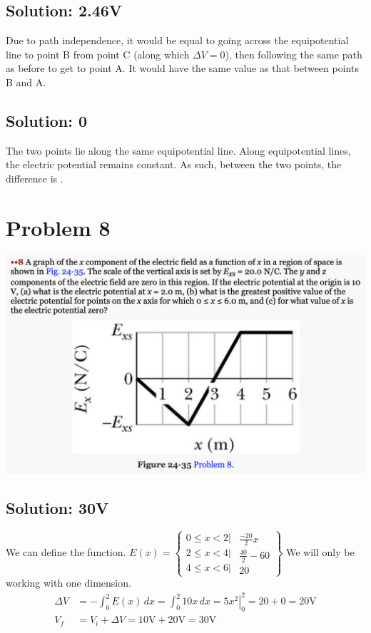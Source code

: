 \documentclass[12pt]{article}
\begin{document}
\subsection{Solution: 2.46V}
Due to path independence, it would be equal to going across the equipotential line to point B from point C (along which $\Delta V = 0$), then following the same path as before to get to point A.
It would have the same value as that between points B and A.

\subsection{Solution: 0}
The two points lie along the same equipotential line. 
Along equipotential lines, the electric potential remains constant.
As such, between the two points, the difference is .
\pagebreak

\section{Problem 8}
\includegraphics[width=\textwidth]{picture_7.png}

\subsection{Solution: 30V}
We can define the function. 
\(E(x) = \left\{ \begin{matrix}
    0 \le x < 2| \\
    2 \le x < 4| \\
    4 \le x < 6| 
\end{matrix}
\begin{matrix}
    \frac{-20}{2}x\\
    \frac{40}{2} - 60\\
    20
\end{matrix} \right\}\)
We will only be working with one dimension.
\begin{align*}
    \Delta V &= -\int_{0}^{2} E(x)\,dx
        =   \int_0^2 10x\,dx
        =   \left. 5x^2 \right|_0^2
        =   20 + 0
        =   20 \unit{\volt}\\
    V_f &=  V_i + \Delta V
        =   10 \unit{\volt} + 20 \unit{\volt}
        =   \boxed{30 \unit{\volt}}
\end{align*}
\end{document}
